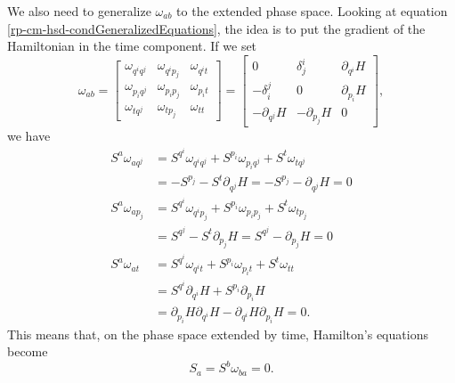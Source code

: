 We also need to generalize $\omega_{ab}$ to the extended phase space. Looking at equation \ref{rp-cm-hsd-condGeneralizedEquations}, the idea is to put the gradient of the Hamiltonian in the time component. If we set
\begin{equation}\label{rp-cm-lm-contactForm}
	\tag{SF-EPS}
	\omega_{ab} = \left[\begin{array}{ccc}
		\omega_{q^i q^j} & \omega_{q^i p_j} & \omega_{q^i t} \\
		\omega_{p_i q^j} & \omega_{p_i p_j} & \omega_{p_i t} \\
		\omega_{t q^j} & \omega_{t p_j} & \omega_{t t} 
	\end{array} \right]= \left[\begin{array}{ccc}
		0 & \delta^i_j & \partial_{q^i} H \\
		- \delta_i^j & 0 & \partial_{p_i} H \\
		- \partial_{q^j} H & -\partial_{p_j} H & 0
	\end{array} \right] ,
\end{equation}
we have
\begin{equation}
	\begin{aligned}
		S^a \omega_{a q^j} &= S^{q^i}\omega_{q^i q^j} + S^{p_i}\omega_{p_i q^j} + S^{t} \omega_{t q^j} \\
		&= - S^{p_j} - S^{t} \partial_{q^j} H = - S^{p_j} -  \partial_{q^j} H = 0 \\
		S^a \omega_{a p_j} &= S^{q^i}\omega_{q^i p_j} + S^{p_i}\omega_{p_i p_j} + S^{t} \omega_{t p_j} \\
		&= S^{q^j} - S^{t} \partial_{p_j} H = S^{q^j} -  \partial_{p_j} H = 0 \\
		S^a \omega_{a t} &= S^{q^i}\omega_{q^i t} + S^{p_i}\omega_{p_i t} + S^{t} \omega_{t t} \\
		&= S^{q^i} \partial_{q^i} H + S^{p_i} \partial_{p_i} H \\
		&= \partial_{p_i} H \partial_{q^i} H - \partial_{q^i} H \partial_{p_i} H = 0.
	\end{aligned}
\end{equation}
This means that, on the phase space extended by time, Hamilton's equations become
\begin{equation}\label{rp-cm-lm-ExtPSEquation}
	\tag{HM-EPS}
	S_a = S^b \omega_{ba} = 0.
\end{equation}
